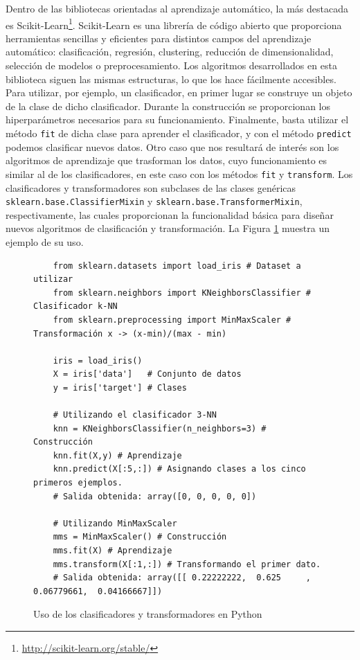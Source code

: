 Dentro de las bibliotecas orientadas al aprendizaje automático, la más destacada es Scikit-Learn\footnote{\url{http://scikit-learn.org/stable/}}. Scikit-Learn es una librería de código abierto que proporciona herramientas sencillas y eficientes para distintos campos del aprendizaje automático: clasificación, regresión, clustering, reducción de dimensionalidad, selección de modelos o preprocesamiento. Los algoritmos desarrollados en esta biblioteca siguen las mismas estructuras, lo que los hace fácilmente accesibles. Para utilizar, por ejemplo, un clasificador, en primer lugar se construye un objeto de la clase de dicho clasificador. Durante la construcción se proporcionan los hiperparámetros necesarios para su funcionamiento. Finalmente, basta utilizar el método \texttt{fit} de dicha clase para aprender el clasificador, y con el método \texttt{predict} podemos clasificar nuevos datos. Otro caso que nos resultará de interés son los algoritmos de aprendizaje que trasforman los datos, cuyo funcionamiento es similar al de los clasificadores, en este caso con los métodos \texttt{fit} y \texttt{transform}. Los clasificadores y transformadores son subclases de las clases genéricas \texttt{sklearn.base.ClassifierMixin} y \texttt{sklearn.base.TransformerMixin}, respectivamente, las cuales proporcionan la funcionalidad básica para diseñar nuevos algoritmos de clasificación y transformación. La Figura \ref{fig:ex_clf_trf_python} muestra un ejemplo de su uso.

\begin{figure}[h]
\begin{verbatim}
    from sklearn.datasets import load_iris # Dataset a utilizar
    from sklearn.neighbors import KNeighborsClassifier # Clasificador k-NN
    from sklearn.preprocessing import MinMaxScaler # Transformación x -> (x-min)/(max - min)

    iris = load_iris()
    X = iris['data']   # Conjunto de datos
    y = iris['target'] # Clases

    # Utilizando el clasificador 3-NN
    knn = KNeighborsClassifier(n_neighbors=3) # Construcción
    knn.fit(X,y) # Aprendizaje
    knn.predict(X[:5,:]) # Asignando clases a los cinco primeros ejemplos.
    # Salida obtenida: array([0, 0, 0, 0, 0])

    # Utilizando MinMaxScaler
    mms = MinMaxScaler() # Construcción
    mms.fit(X) # Aprendizaje
    mms.transform(X[:1,:]) # Transformando el primer dato.
    # Salida obtenida: array([[ 0.22222222,  0.625     ,  0.06779661,  0.04166667]])

\end{verbatim}
\caption{Uso de los clasificadores y transformadores en Python} \label{fig:ex_clf_trf_python}
\end{figure}


